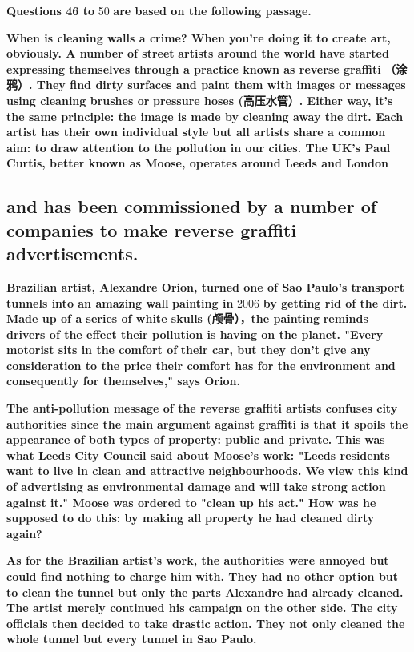 \documentclass[UTF8,11pt]{ctexart}
\begin{document}
\textbf{Questions 46 to }50 \textbf{are based on the following passage.}


\textbf{When is cleaning walls a crime? When you're doing it to create art, obviously. A number of street} \textbf{artists around the world have started expressing themselves through a practice known as reverse graffiti} \textbf{（涂鸦）. They find dirty surfaces and paint them with images or messages using cleaning brushes or} \textbf{pressure hoses (高压水管）. Either way, it's the same principle: the image is made by cleaning away the} \textbf{dirt. Each artist has their own individual style but all artists share a common aim: to draw attention to the} \textbf{pollution in our cities. The UK's Paul Curtis, better known as Moose, operates around Leeds and London}


\subsection*{\textbf{and has been commissioned by a number of companies to make reverse graffiti advertisements.}}


\textbf{Brazilian artist, Alexandre Orion, turned one of Sao Paulo's transport tunnels into an amazing wall} \textbf{painting in }2006 \textbf{by getting rid of the dirt. Made up of a series of white skulls (颅骨），the painting} \textbf{reminds drivers of the effect their pollution is having on the planet. "Every motorist sits in the comfort of} \textbf{their car, but they don't give any consideration to the price their comfort has for the environment and} \textbf{consequently for themselves," says Orion.}


\textbf{The anti-pollution message of the reverse graffiti artists confuses city authorities since the main} \textbf{argument against graffiti is that it spoils the appearance of both types of property: public and private. This} \textbf{was what Leeds City Council said about Moose's work: "Leeds residents want to live in clean and attractive} \textbf{neighbourhoods. We view this kind of advertising as environmental damage and will take strong action} \textbf{against it." Moose was ordered to "clean up his act." How was he supposed to do this: by making all} \textbf{property he had cleaned dirty again?}


\textbf{As for the Brazilian artist's work, the authorities were annoyed but could find nothing to charge him} \textbf{with. They had no other option but to clean the tunnel but only the parts Alexandre had already cleaned.} \textbf{The artist merely continued his campaign on the other side. The city officials then decided to take drastic} \textbf{action. They not only cleaned the whole tunnel but every tunnel in Sao Paulo.}
\end{document}
